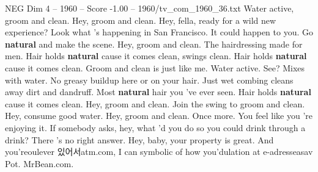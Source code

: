 \begin{textsample}{NEG Dim 4 – 1960 – Score -1.00 – 1960/tv\_com\_1960\_36.txt}  \label{ex:f4_neg_089}
Water active, groom and clean.
Hey, groom and clean.
Hey, fella, ready for a wild new experience?
Look what 's happening in San Francisco.
It could happen to you.
Go \textbf{natural} and make the scene.
Hey, groom and clean.
The hairdressing made for men.
Hair holds \textbf{natural} cause it comes clean, swings clean.
Hair holds \textbf{natural} cause it comes clean.
Groom and clean is just like me.
Water active.
See?
Mixes with water.
No greasy buildup here or on your hair.
Just wet combing cleans away dirt and dandruff.
Most \textbf{natural} hair you 've ever seen.
Hair holds \textbf{natural} cause it comes clean.
Hey, groom and clean.
Join the swing to groom and clean.
Hey, consume good water.
Hey, groom and clean.
Once more.
You feel like you 're enjoying it.
If somebody asks, hey, what 'd you do so you could drink through a drink?
There 's no right answer.
Hey, baby, your property is great.
And you'reoulever 있어서atm.com, I can symbolic of how you'dulation at e-adresseasav Pot.
MrBean.com.

\end{textsample}
